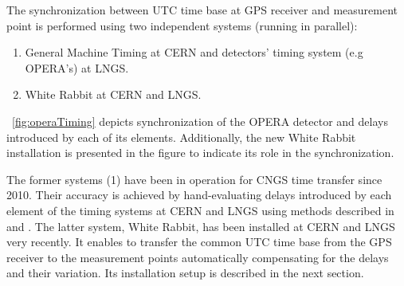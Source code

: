 The synchronization between UTC time base at GPS receiver and measurement point is performed 
using two independent systems (running in parallel):
\begin{enumerate}
  \item General Machine Timing at CERN and detectors' timing system (e.g OPERA's) at LNGS.
  \item White Rabbit at CERN and LNGS.
\end{enumerate}
\figurename~\ref{fig:operaTiming} depicts synchronization of the OPERA \cite{biblio:TOF} 
detector and delays introduced by each of its elements. Additionally, the new White Rabbit 
installation is presented in the figure to indicate its role in the synchronization. 

The former systems (1) have been in operation for CNGS time transfer since 2010. 
Their accuracy is achieved by hand-evaluating delays introduced by each element of the timing 
systems at CERN and LNGS using methods described in 
\cite{biblio:BECOHT_CNGS} and \cite{biblio:TOF}.
The latter system, White Rabbit, has been installed at CERN and LNGS very recently. 
It enables to transfer the common UTC time base from the GPS 
receiver to the measurement points automatically compensating for the delays and their variation. 
Its installation setup is described in the next section. 

